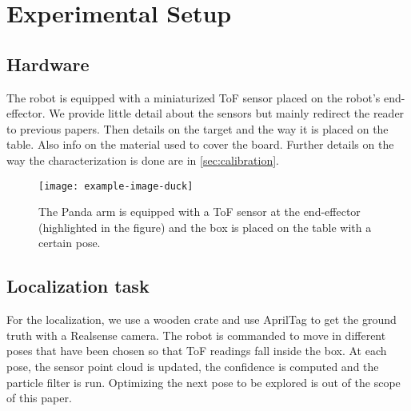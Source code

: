 \section{Experimental Setup}\label{sec:setup}

\subsection{Hardware}
The robot is equipped with a miniaturized ToF sensor placed on the robot's end-effector. We provide little detail about the sensors but mainly redirect the reader to previous papers. Then details on the target and the way it is placed on the table. Also info on the material used to cover the board. Further details on the way the characterization is done are in \cref{sec:calibration}.

\begin{figure}[]
    \centering
    \texttt{[image: example-image-duck]}
    \caption{The Panda arm is equipped with a ToF sensor at the end-effector (highlighted in the figure) and the box is placed on the table with a certain pose.}
    \label{fig:sensors}
\end{figure}

\subsection{Localization task}
For the localization, we use a wooden crate and use AprilTag to get the ground truth with a Realsense camera.
The robot is commanded to move in different poses that have been chosen so that ToF readings fall inside the box. At each pose, the sensor point cloud is updated, the confidence is computed and the particle filter is run. Optimizing the next pose to be explored is out of the scope of this paper. 



